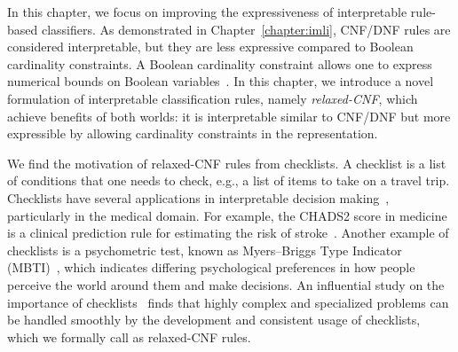 
\label{chapter:crr}


In this chapter, we focus on improving the expressiveness of interpretable rule-based classifiers. As demonstrated in Chapter~\ref{chapter:imli}, CNF/DNF rules are considered interpretable, but they are less expressive compared to Boolean cardinality constraints. A Boolean cardinality constraint allows one to express numerical bounds on Boolean variables~\cite{sinz2005towards}. In this chapter, we introduce a novel formulation of interpretable classification rules, namely \emph{relaxed-CNF}, which achieve benefits of  both worlds: it is interpretable similar to CNF/DNF  but more expressible by allowing cardinality constraints in the representation.


We find the motivation of relaxed-CNF rules from checklists. A checklist is a list of conditions that one needs to check, e.g., a list of items to take on a travel trip.  Checklists have several applications in interpretable decision making~\cite{M1976,gage2001validation}, particularly in the medical domain. For example, the  CHADS2 score in medicine is a clinical prediction rule for estimating the risk of stroke~\cite{gage2001validation}. Another example of checklists is a psychometric test, known as Myers–Briggs Type Indicator (MBTI)~\cite{M1976}, which indicates differing psychological preferences in how people perceive the world around them and make decisions.  An influential study on the importance of {checklists}~\cite{G2010} finds that highly complex and specialized problems can be handled smoothly by the development and consistent usage of checklists, which we formally call as relaxed-CNF rules. 


